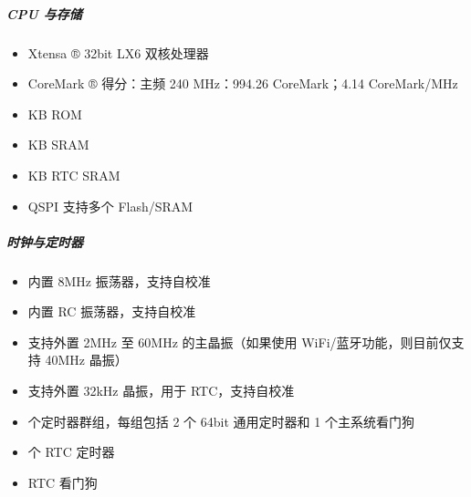 \documentclass[a4paper,12pt,english]{sphinxmanual}
\begin{document}
\subparagraph{CPU 与存储}
\label{\detokenize{dev-board/esp32:cpu}}\begin{itemize}
\item {} 
\sphinxAtStartPar
Xtensa ® 32\sphinxhyphen{}bit LX6 双核处理器

\item {} 
\sphinxAtStartPar
CoreMark ® 得分：主频 240 MHz：994.26 CoreMark；4.14 CoreMark/MHz

\item {} 
 KB ROM

\item {} 
 KB SRAM

\item {} 
 KB RTC SRAM

\item {} 
\sphinxAtStartPar
QSPI 支持多个 Flash/SRAM

\end{itemize}


\subparagraph{时钟与定时器}
\label{\detokenize{dev-board/esp32:id4}}\begin{itemize}
\item {} 
\sphinxAtStartPar
内置 8MHz 振荡器，支持自校准

\item {} 
\sphinxAtStartPar
内置 RC 振荡器，支持自校准

\item {} 
\sphinxAtStartPar
支持外置 2MHz 至 60MHz 的主晶振（如果使用 Wi\sphinxhyphen{}Fi/蓝牙功能，则目前仅支持 40MHz 晶振）

\item {} 
\sphinxAtStartPar
支持外置 32kHz 晶振，用于 RTC，支持自校准

\item {} 
 个定时器群组，每组包括 2 个 64\sphinxhyphen{}bit 通用定时器和 1 个主系统看门狗

\item {} 
 个 RTC 定时器

\item {} 
\sphinxAtStartPar
RTC 看门狗

\end{itemize}
\end{document}

